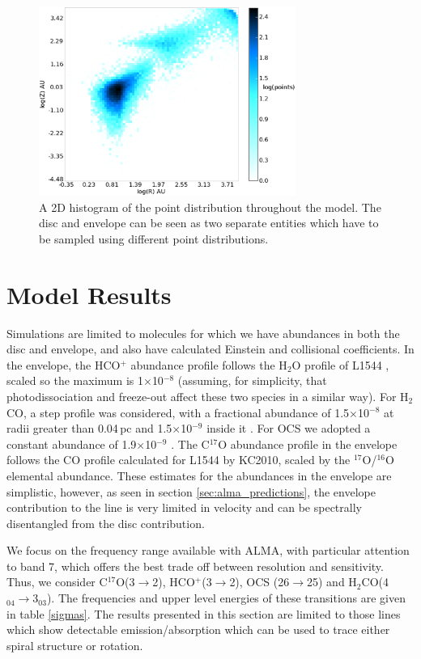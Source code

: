 \documentclass[useAMS,usenatbib]{mn2e}
\begin{document}
\begin{figure}
 \includegraphics[width=84mm]{Figures/model/lime_points_rz_histo3.eps}
 \caption{A 2D histogram of the point distribution throughout the model. The disc and envelope can be seen as two separate entities which have to be sampled using different point distributions.}
 \label{points}
\end{figure}


\section{Model Results} \label{sec:model_results}

Simulations are limited to molecules for which we have abundances in both the disc and envelope, and also have calculated Einstein and collisional coefficients. In the envelope, the HCO$^+$ abundance profile follows the H$_2$O profile of L1544 \citep{Caselli2012}, scaled so the maximum is 1$\times$10$^{-8}$ (assuming, for simplicity, that photodissociation and freeze-out affect these two species in a similar way). For H$_2$CO, a step profile was considered, with a fractional abundance of 1.5$\times$10$^{-8}$ at radii greater than 0.04$\,$pc and 1.5$\times$10$^{-9}$ inside it \citep{Young2004}. For OCS we adopted a constant abundance of 1.9$\times$10$^{-9}$ \citep{Ren2011}. The C$^{17}$O abundance profile in the envelope follows the CO profile calculated for L1544 by KC2010, scaled by the $^{17}$O/$^{16}$O elemental abundance. These estimates for the abundances in the envelope are simplistic, however, as seen in section \ref{sec:alma_predictions}, the envelope contribution to the line is very limited in velocity and can be spectrally disentangled from the disc contribution.\smallskip

We focus on the frequency range available with ALMA, with particular attention to band 7, which offers the best trade off between resolution and sensitivity. Thus, we consider C$^{17}$O(3$\rightarrow$2), HCO$^+$(3$\rightarrow$2), OCS (26$\rightarrow$25) and H$_2$CO(4$_{04}\rightarrow$3$_{03}$).  The frequencies and upper level energies of these transitions are given in table \ref{sigmas}. The results presented in this section are limited to those lines which show detectable emission/absorption which can be used to trace either spiral structure or rotation.\smallskip
\end{document}
